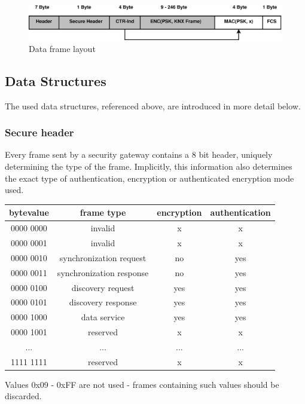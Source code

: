 \begin{figure}
  \centering
    \includegraphics[width=1\textwidth]{figures/formatData.eps}
 \caption{Data  frame layout}
 \label{fig:dataFormat}
\end{figure}

\subsection{Data Structures}

The used data structures, referenced above, are introduced in more detail below.

\subsubsection{Secure header}\label{secHdr}
Every frame sent by a security gateway contains a 8 bit header, uniquely determining the type of the frame. Implicitly, this information also determines
the exact type of authentication, encryption or authenticated encryption mode used.

\begin{center}
\begin{tabular}{ c | c | c | c}
 \label{table:secHeader}
   bytevalue & frame type & encryption & authentication \\ \hline
   0000 0000 & invalid & x & x \\
   0000 0001 & invalid & x & x \\
   0000 0010 & synchronization request & no & yes \\
   0000 0011 & synchronization response & no & yes \\
   0000 0100 & discovery request & yes & yes \\
   0000 0101 & discovery response & yes & yes \\
   0000 1000 & data service & yes & yes \\
   0000 1001 & reserved & x & x \\
   ...  & ...  & ... & ... \\
   1111 1111 & reserved & x & x \\
\end{tabular}
\end{center}
Values 0x09 - 0xFF are not used - frames containing such values should be discarded.

